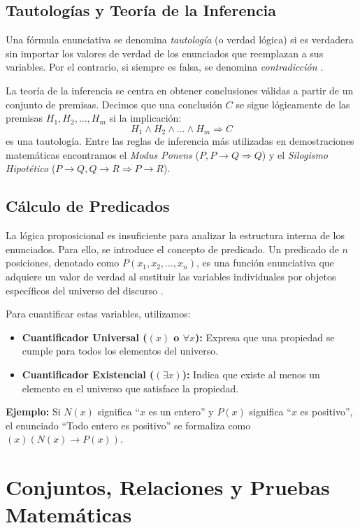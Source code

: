 \documentclass[12pt, letterpaper]{article}
\begin{document}
\subsection{Tautologías y Teoría de la Inferencia}
Una fórmula enunciativa se denomina \textit{tautología} (o verdad lógica) si es verdadera sin importar los valores de verdad de los enunciados que reemplazan a sus variables. Por el contrario, si siempre es falsa, se denomina \textit{contradicción} \cite{tremblay2000matematicas}.

La teoría de la inferencia se centra en obtener conclusiones válidas a partir de un conjunto de premisas. Decimos que una conclusión $C$ se sigue lógicamente de las premisas $H_1, H_2, \dots, H_m$ si la implicación:
$$H_1 \wedge H_2 \wedge \dots \wedge H_m \Rightarrow C$$
es una tautología. Entre las reglas de inferencia más utilizadas en demostraciones matemáticas encontramos el \textit{Modus Ponens} ($P, P \rightarrow Q \Rightarrow Q$) y el \textit{Silogismo Hipotético} ($P \rightarrow Q, Q \rightarrow R \Rightarrow P \rightarrow R$).

\subsection{Cálculo de Predicados}
La lógica proposicional es insuficiente para analizar la estructura interna de los enunciados. Para ello, se introduce el concepto de predicado. Un predicado de $n$ posiciones, denotado como $P(x_1, x_2, \dots, x_n)$, es una función enunciativa que adquiere un valor de verdad al sustituir las variables individuales por objetos específicos del universo del discurso \cite{tremblay2000matematicas}.

Para cuantificar estas variables, utilizamos:
\begin{itemize}
    \item \textbf{Cuantificador Universal ($(x)$ o $\forall x$):} Expresa que una propiedad se cumple para todos los elementos del universo.
    \item \textbf{Cuantificador Existencial ($(\exists x)$):} Indica que existe al menos un elemento en el universo que satisface la propiedad.
\end{itemize}

\textbf{Ejemplo:} Si $N(x)$ significa ``$x$ es un entero'' y $P(x)$ significa ``$x$ es positivo'', el enunciado ``Todo entero es positivo'' se formaliza como $(x)(N(x) \rightarrow P(x))$.

\section{Conjuntos, Relaciones y Pruebas Matemáticas}
\end{document}

